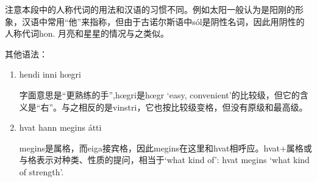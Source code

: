 \begin{grammar*}{}
    注意本段中的人称代词的用法和汉语的习惯不同。例如太阳一般认为是阳刚的形象，汉语中常用“他”来指称，但由于古诺尔斯语中sól是阴性名词，因此用阴性的人称代词hon. 月亮和星星的情况与之类似。

    其他语法：
    \begin{enumerate}
        \item hendi inni hœgri

              字面意思是“更熟练的手”,hœgri是hœgr `easy, convenient'的比较级，但它的含义是“右”。与之相反的是vinstri，它也按比较级变格，但没有原级和最高级。

        \item hvat hann megins átti

              megins是属格，而eiga接宾格，因此megins在这里和hvat相呼应。hvat+属格或与格表示对种类、性质的提问，相当于`what kind of': hvat megins `what kind of strength'.
    \end{enumerate}
\end{grammar*}
\medskip %

